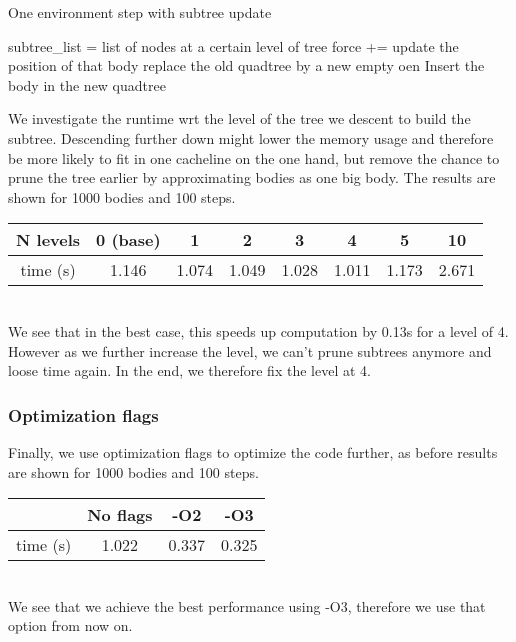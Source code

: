 \documentclass[a4paper]{scrartcl}
\begin{document}
            \begin{algorithm}[H]
                \caption{One environment step with subtree update}\label{alg:step}
                \begin{algorithmic}[1]
                \State subtree\_list = list of nodes at a certain level of tree
                    \State force += 
                    \EndFor
                \EndFor
                \State update the position of that body
                \EndFor
                \State replace the old quadtree by a new empty oen
                \State Insert the body in the new quadtree
                \EndFor
                \EndProcedure
                \end{algorithmic}
            \end{algorithm}
            We investigate the runtime wrt the level of the tree we descent to
            build the subtree. Descending further down might lower the memory
            usage and therefore be more likely to fit in one cacheline on the
            one hand, but remove the chance to prune the tree earlier by
            approximating bodies as one big body. The results are shown for 1000
            bodies and 100 steps.

            \noindent\begin{tabular}{c|c|c|c|c|c|c|c}
                N levels & 0 (base) & 1 & 2 & 3 & 4 & 5 & 10 \\
                \hline
                time (s) &  1.146 & 1.074 & 1.049 & 1.028 & 1.011 & 1.173 & 2.671\\
            \end{tabular}\\

            We see that in the best case, this speeds up computation by 0.13s
            for a level of 4. However as we further increase the level, we can't
            prune subtrees anymore and loose time again. In the end, we
            therefore fix the level at 4.

        \subsubsection{Optimization flags}
            Finally, we use optimization flags to optimize the code further, as
            before results are shown for 1000 bodies and 100 steps.\\
            \noindent\begin{tabular}{c|c|c|c}
                 & No flags & -O2 & -O3 \\
                \hline
                time (s) & 1.022 & 0.337 & 0.325\\ 
            \end{tabular}\\
            We see that we achieve the best performance using -O3, therefore we
            use that option from now on.
\end{document}
